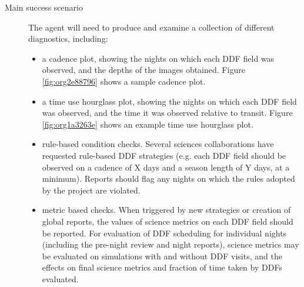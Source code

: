 \begin{description}
\item[{Main success scenario}] The agent will need to produce and examine a collection of different diagnostics, including:
\begin{itemize}
\item a cadence plot, showing the nights on which each DDF field was observed, and the depths of the images obtained. Figure \ref{fig:org2e88796} shows a sample cadence plot.
\item a time use hourglass plot, showing the nights on which each DDF field was observed, and the time it was observed relative to transit. Figure \ref{fig:org1a3263e} shows an example time use hourglass plot.
\item rule-based condition checks. Several sciences collaborations have requested rule-based DDF strategies (e.g. each DDF field should be observed on a cadence of X days and a season length of Y days, at a minimum). Reports should flag any nights on which the rules adopted by the project are violated.
\item metric based checks. When triggered by new strategies or creation of global reports, the values of science metrics on each DDF field should be reported. For evaluation of DDF scheduling for individual nights (including the pre-night review and night reports), science metrics may be evaluated on simulations with and without DDF visits, and the effects on final science metrics and fraction of time taken by DDFs evaluated.
\end{itemize}
\end{description}
